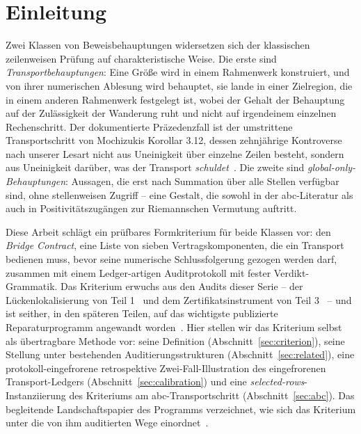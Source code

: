 \documentclass[11pt,a4paper]{article}
\begin{document}
\section{Einleitung}\label{sec:intro}

Zwei Klassen von Beweisbehauptungen widersetzen sich der klassischen
zeilenweisen Prüfung auf charakteristische Weise. Die erste sind
\emph{Transportbehauptungen}: Eine Größe wird in einem Rahmenwerk konstruiert,
und von ihrer numerischen Ablesung wird behauptet, sie lande in einer
Zielregion, die in einem anderen Rahmenwerk festgelegt ist, wobei der Gehalt
der Behauptung auf der Zulässigkeit der Wanderung ruht und nicht auf
irgendeinem einzelnen Rechenschritt. Der dokumentierte Präzedenzfall ist der
umstrittene Transportschritt von Mochizukis Korollar 3.12, dessen
zehnjährige Kontroverse nach unserer Lesart nicht aus Uneinigkeit über
einzelne Zeilen besteht, sondern aus Uneinigkeit darüber, was der Transport
\emph{schuldet}~\cite{part1}. Die zweite sind
\emph{global-only-Behauptungen}: Aussagen, die erst nach Summation über alle
Stellen verfügbar sind, ohne stellenweisen Zugriff -- eine Gestalt, die
sowohl in der abc-Literatur als auch in Positivitätszugängen zur
Riemannschen Vermutung auftritt.

Diese Arbeit schlägt ein prüfbares Formkriterium für beide Klassen vor: den
\emph{Bridge Contract}, eine Liste von sieben Vertragskomponenten, die ein
Transport bedienen muss, bevor seine numerische Schlussfolgerung gezogen
werden darf, zusammen mit einem Ledger-artigen Auditprotokoll mit fester
Verdikt-Grammatik. Das Kriterium erwuchs aus den Audits dieser Serie -- der
Lückenlokalisierung von Teil 1~\cite{part1} und dem Zertifikatsinstrument
von Teil 3~\cite{part3} -- und ist seither, in den späteren Teilen, auf das
wichtigste publizierte Reparaturprogramm angewandt
worden~\cite{part4,part5,part6}. Hier stellen wir das Kriterium selbst als
übertragbare Methode vor: seine Definition
(Abschnitt~\ref{sec:criterion}), seine Stellung unter bestehenden
Auditierungsstrukturen (Abschnitt~\ref{sec:related}), eine
protokoll-eingefrorene retrospektive Zwei-Fall-Illustration des
eingefrorenen Transport-Ledgers (Abschnitt~\ref{sec:calibration}) und eine
\emph{selected-rows}-Instanziierung des Kriteriums am
abc-Transportschritt (Abschnitt~\ref{sec:abc}). Das begleitende
Landschaftspapier des Programms verzeichnet, wie sich das Kriterium unter
die von ihm auditierten Wege einordnet~\cite{landscapeA}.
\end{document}
